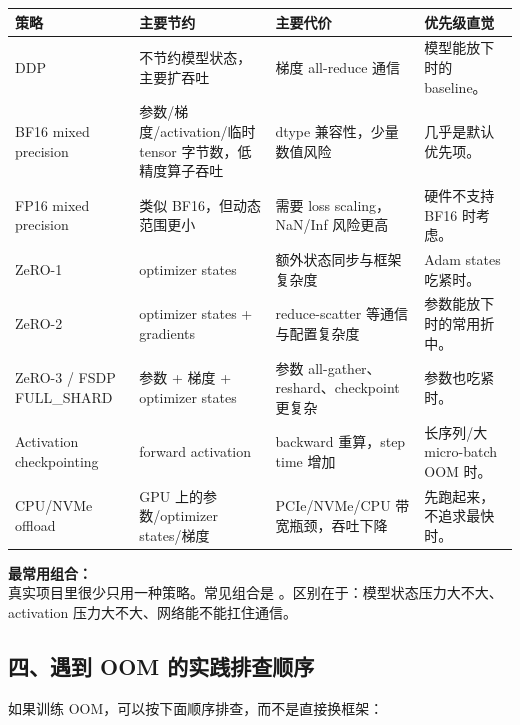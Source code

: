\begin{center}
{\small
\begin{tabular}{p{3.2cm}p{3.8cm}p{3.4cm}p{2.6cm}}
\hline
\textbf{策略} & \textbf{主要节约} & \textbf{主要代价} & \textbf{优先级直觉} \\
\hline
DDP & 不节约模型状态，主要扩吞吐 & 梯度 all-reduce 通信 & 模型能放下时的 baseline。 \\
BF16 mixed precision & 参数/梯度/activation/临时 tensor 字节数，低精度算子吞吐 & dtype 兼容性，少量数值风险 & 几乎是默认优先项。 \\
FP16 mixed precision & 类似 BF16，但动态范围更小 & 需要 loss scaling，NaN/Inf 风险更高 & 硬件不支持 BF16 时考虑。 \\
ZeRO-1 & optimizer states & 额外状态同步与框架复杂度 & Adam states 吃紧时。 \\
ZeRO-2 & optimizer states + gradients & reduce-scatter 等通信与配置复杂度 & 参数能放下时的常用折中。 \\
ZeRO-3 / FSDP FULL\_SHARD & 参数 + 梯度 + optimizer states & 参数 all-gather、reshard、checkpoint 更复杂 & 参数也吃紧时。 \\
Activation checkpointing & forward activation & backward 重算，step time 增加 & 长序列/大 micro-batch OOM 时。 \\
CPU/NVMe offload & GPU 上的参数/optimizer states/梯度 & PCIe/NVMe/CPU 带宽瓶颈，吞吐下降 & 先跑起来，不追求最快时。 \\
\hline
\end{tabular}
}
\end{center}

\begin{intubox}
\textbf{最常用组合：}\\
真实项目里很少只用一种策略。常见组合是 。区别在于：模型状态压力大不大、activation 压力大不大、网络能不能扛住通信。
\end{intubox}

\subsection{四、遇到 OOM 的实践排查顺序}

如果训练 OOM，可以按下面顺序排查，而不是直接换框架：

